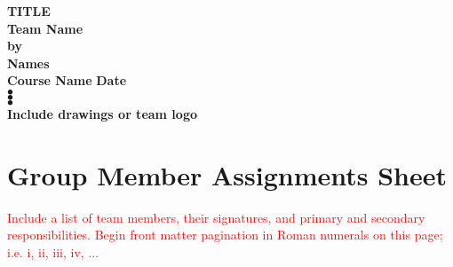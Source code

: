 \documentclass[conf]{new-aiaa}
\begin{document}
\begin{titlepage}
    \begin{center}
        \vspace*{1cm}
        \large
        \textbf{TITLE} \\
        \vspace{0.5cm}
        \textbf{Team Name} \\
        \vspace{0.5cm}
        \normalsize
        \textbf{by} \\
        \vspace{0.5cm}
        \textbf{Names} \\
        \vspace{0.5cm}
        \textbf{Course Name}
        \vspace{0.5cm}
        \textbf{Date} \\
        \vspace{2.5cm}
        $\bullet$\\
        \vspace{2.5cm}
        $\bullet$\\
        \vspace{2.5cm}
        $\bullet$\\
        \vspace{1.75cm}
        \textbf{Include drawings or team logo}
    \end{center}
\end{titlepage}

\newpage

\section{Group Member Assignments Sheet}

\textcolor{red}{Include  a  list  of  team  members,  their  signatures,  and  primary  and  secondary  responsibilities.  Begin front matter pagination in Roman numerals on this page; i.e. i, ii, iii, iv, ...}
\newpage

\tableofcontents

\newpage
\end{document}
